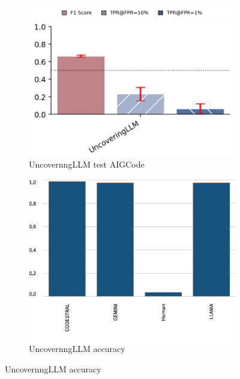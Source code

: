 \begin{figure}[H]
    \begin{subfigure}[b]{0.4\textwidth}
        \centering
        \includegraphics[width=\linewidth]{img/TEST/UncovernngLLM/AIG/rr.png}
        \caption{UncovernngLLM test AIGCode}
        \label{fig:c3}
    \end{subfigure}
    \hfill
    \begin{subfigure}[t]{0.4\textwidth}
        \centering
        \includegraphics[width=\linewidth]{img/TEST/UncovernngLLM/visualization(59).png}
        \caption{UncovernngLLM accuracy }
        \label{fig:cc3}
    \end{subfigure}
\end{figure}


